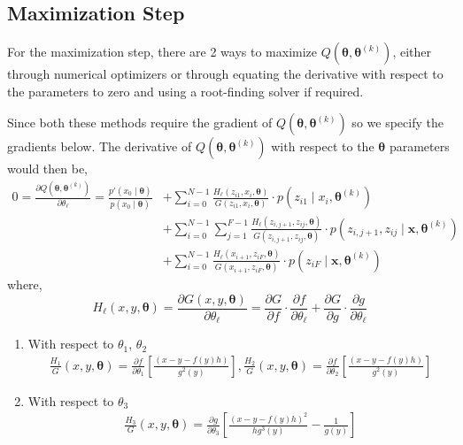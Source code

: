 \documentclass[12pt]{article}
\newcommand{\bx}{\ensuremath{\mathbf{x}}}
\newcommand{\btheta}{\ensuremath{\boldsymbol{\theta}}}
\begin{document}
\subsection{Maximization Step}
For the maximization step, there are 2 ways to maximize $Q(\btheta, \btheta^{(k)})$, either through numerical optimizers or through equating the derivative with respect to the parameters to zero and using a root-finding solver if required.

Since both these methods require the gradient of $Q(\btheta, \btheta^{(k)})$ so we specify the gradients below. The derivative of $Q(\btheta, \btheta^{(k)})$ with respect to the $\btheta$ parameters would then be,
\begin{align*}
0 = \frac{\partial Q(\btheta, \btheta^{(k)})}{\partial \theta_{\ell}} = \frac{p'(x_0 \mid \btheta)}{p(x_0 \mid \btheta)} & + \sum_{i=0}^{N-1} \frac{H_{\ell}(z_{i1}, x_i, \btheta)}{G(z_{i1}, x_i, \btheta)} \cdot p(z_{i1} \mid x_i, \btheta^{(k)}) \\
& + \sum_{i=0}^{N-1} \sum_{j=1}^{F-1} \frac{H_{\ell}(z_{i,j+1}, z_{ij}, \btheta)}{G(z_{i,j+1}, z_{ij}, \btheta)} \cdot p(z_{i,j+1}, z_{ij} \mid \bx, \btheta^{(k)}) \nonumber \\
& + \sum_{i=0}^{N-1} \frac{H_{\ell}(x_{i+1}, z_{iF}, \btheta)}{G(x_{i+1}, z_{iF}, \btheta)} \cdot p(z_{iF} \mid \bx, \btheta^{(k)})
\end{align*}
where, $$H_{\ell}(x,y,\btheta) = \frac{\partial G(x,y,\btheta)}{\partial \theta_{\ell}} = \frac{\partial G}{\partial f}\cdot \frac{\partial f}{\partial \theta_{\ell}} + \frac{\partial G}{\partial g} \cdot \frac{\partial g}{\partial \theta_{\ell}} $$
\begin{enumerate}
\item With respect to $\theta_1$, $\theta_2$
\begin{align*}
\frac{H_{1}}{G}(x,y,\btheta) = \frac{\partial f}{\partial \theta_1} \left[ \frac{(x - y - f(y)h)}{g^2(y)} \right], \frac{H_{2}}{G}(x,y,\btheta) = \frac{\partial f}{\partial \theta_2} \left[ \frac{(x - y - f(y)h)}{g^2(y)} \right]
\end{align*}
\item With respect to $\theta_3$
\begin{align*}
\frac{H_{3}}{G}(x,y,\btheta) = \frac{\partial g}{\partial \theta_3} \left[ \frac{(x - y - f(y)h)^2}{h g^3(y)} - \frac{1}{g(y)} \right]
\end{align*}
\end{enumerate}
\end{document}
